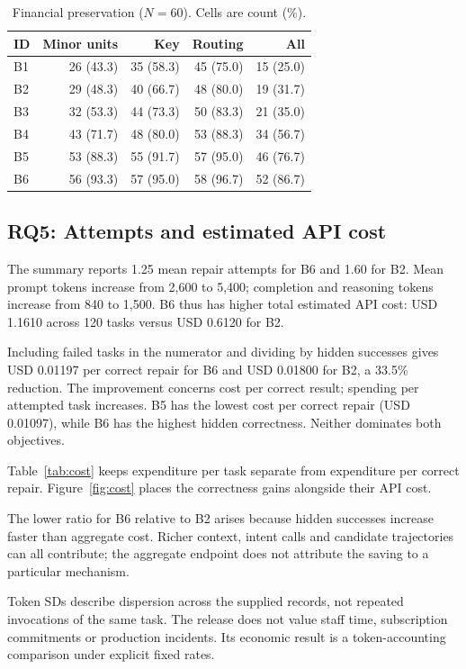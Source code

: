 \begin{table}[t]\centering\small\setlength{\tabcolsep}{3pt}
\caption{Financial preservation ($N=60$). Cells are count (\%).}\label{tab:financial}
\begin{tabular*}{\columnwidth}{@{\extracolsep{\fill}}lrrrr@{}}\toprule
ID & Minor units & Key & Routing & All\\\midrule
B1 & 26 (43.3) & 35 (58.3) & 45 (75.0) & 15 (25.0)\\
B2 & 29 (48.3) & 40 (66.7) & 48 (80.0) & 19 (31.7)\\
B3 & 32 (53.3) & 44 (73.3) & 50 (83.3) & 21 (35.0)\\
B4 & 43 (71.7) & 48 (80.0) & 53 (88.3) & 34 (56.7)\\
B5 & 53 (88.3) & 55 (91.7) & 57 (95.0) & 46 (76.7)\\
B6 & 56 (93.3) & 57 (95.0) & 58 (96.7) & 52 (86.7)\\\bottomrule
\end{tabular*}
\end{table}

\subsection{RQ5: Attempts and estimated API cost}
The summary reports 1.25 mean repair attempts for B6 and 1.60 for B2. Mean prompt tokens increase from 2,600 to 5,400; completion and reasoning tokens increase from 840 to 1,500. B6 thus has higher total estimated API cost: USD 1.1610 across 120 tasks versus USD 0.6120 for B2.

Including failed tasks in the numerator and dividing by hidden successes gives USD 0.01197 per correct repair for B6 and USD 0.01800 for B2, a 33.5\% reduction. The improvement concerns cost per correct result; spending per attempted task increases. B5 has the lowest cost per correct repair (USD 0.01097), while B6 has the highest hidden correctness. Neither dominates both objectives.



Table~\ref{tab:cost} keeps expenditure per task separate from expenditure per correct repair. Figure~\ref{fig:cost} places the correctness gains alongside their API cost.

\ifAccess

The lower ratio for B6 relative to B2 arises because hidden successes increase faster than aggregate cost. Richer context, intent calls and candidate trajectories can all contribute; the aggregate endpoint does not attribute the saving to a particular mechanism.

Token SDs describe dispersion across the supplied records, not repeated invocations of the same task. The release does not value staff time, subscription commitments or production incidents. Its economic result is a token-accounting comparison under explicit fixed rates.
\fi
